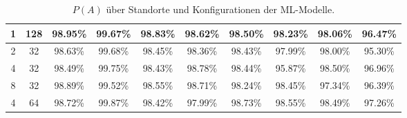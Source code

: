 \begin{table}
\begin{tabular}{ | c | c | c | c | c | c | c | c | c | c | }
        1 & 128 & 98.95\% & 99.67\% & 98.83\% & 98.62\% & 98.50\% & 98.23\% & 98.06\% & 96.47\% \\\hline
        2 & 32 & 98.63\% & 99.68\% & 98.45\% & 98.36\% & 98.43\% & 97.99\% & 98.00\% & 95.30\% \\\hline
        4 & 32 & 98.49\% & 99.75\% & 98.43\% & 98.78\% & 98.44\% & 95.87\% & 98.50\% & 96.96\% \\\hline
        8 & 32 & 98.89\% & 99.52\% & 98.55\% & 98.71\% & 98.24\% & 98.45\% & 97.34\% & 96.39\% \\\hline
        4 & 64 & 98.72\% & 99.87\% & 98.42\% & 97.99\% & 98.73\% & 98.55\% & 98.49\% & 97.26\% \\\hline
    \end{tabular}
    \caption{$P(A)$ über Standorte und Konfigurationen der ML-Modelle.}
    \label{tab:predictions_by_acc}
\end{table}

